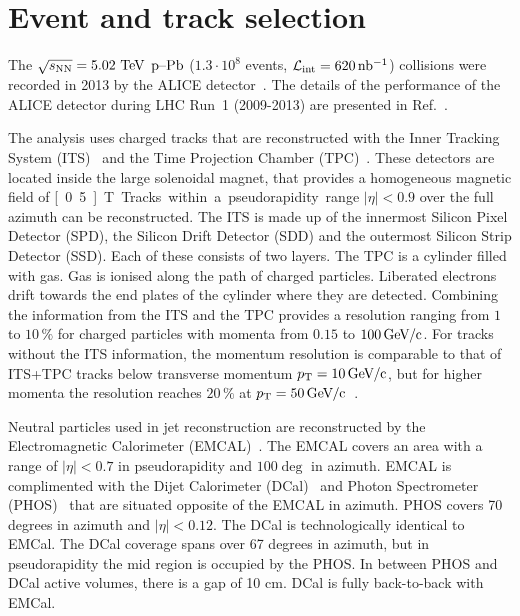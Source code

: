 \section{Event and track selection}
The $\sqrt{s_{\mathrm{NN}}} = 5.02~\mathrm{TeV}$ $\mbox{p--Pb}$ ($1.3 \cdot 10^{8}$ events, $\mathcal{L}_{\mathrm{int}} = \unit[620]{nb^{-1}}$) collisions were recorded in 2013 by the ALICE detector~\cite{aliceDetector}. The details of the performance of the ALICE detector during LHC Run~1 (2009-2013) are presented in Ref.~\cite{alicePerformance}.

The analysis uses charged tracks that are reconstructed with the Inner Tracking System (ITS)~\cite{aliceITS} and the Time Projection Chamber (TPC)~\cite{aliceTPC}. These detectors are located inside the large solenoidal magnet, that provides a homogeneous magnetic field of \unit[0.5]{T}. Tracks within a pseudorapidity range $|\eta| < 0.9$ over the full azimuth can be reconstructed. The ITS is made up of the innermost Silicon Pixel Detector (SPD), the Silicon Drift Detector (SDD) and the outermost Silicon Strip Detector (SSD). Each of these consists of two layers. The TPC is a cylinder filled with gas. Gas is ionised along the path of charged particles. Liberated electrons drift towards the end plates of the cylinder where they are detected. Combining the information from the ITS and the TPC provides a resolution ranging from $1$ to $10\,\%$ for charged particles with momenta from $0.15$ to $\unit[100]{\GeVc}$. For tracks without the ITS information, the momentum resolution is comparable to that of ITS+TPC tracks below transverse momentum $\pt{} = \unit[10]{\GeVc}$, but for higher momenta the resolution reaches $20\,\%$ at $\pt{} = \unit[50]{\GeVc}$~\cite{alicePerformance,aliceBackgroundFluctuation}. 

Neutral particles used in jet reconstruction are reconstructed by the Electromagnetic Calorimeter (EMCAL)~\cite{Cortese:2008zza}. The EMCAL covers an area with a range of $|\eta| < 0.7$  in pseudorapidity and $ 100 \deg $ in azimuth. EMCAL is complimented with the Dijet Calorimeter (DCal)~\cite{DCAL} and Photon Spectrometer (PHOS)~\cite{PHOS} that are situated opposite of the EMCAL in azimuth. PHOS covers 70 degrees in azimuth and $\left| \eta \right| < 0.12$. The DCal is technologically identical to EMCal. The DCal coverage spans over 67 degrees in azimuth, but in pseudorapidity the mid region is occupied by the PHOS. In between PHOS and DCal active volumes, there is a gap of 10 cm. DCal is fully back-to-back with EMCal.

